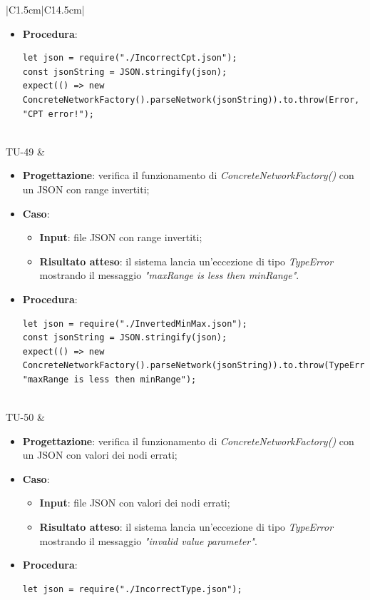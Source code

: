 \begin{longtable}{|C{1.5cm}|C{14.5cm}|}
\begin{itemize}
\begin{itemize}
		\end{itemize}
		\item \textbf{Procedura}:
		\begin{lstlisting}
let json = require("./IncorrectCpt.json");
const jsonString = JSON.stringify(json);
expect(() => new ConcreteNetworkFactory().parseNetwork(jsonString)).to.throw(Error, "CPT error!");
		\end{lstlisting}
	\end{itemize}\\
	\hline
	{TU-49} &
	\begin{itemize}
		\item \textbf{Progettazione}: verifica il funzionamento di \emph{ConcreteNetworkFactory()} con un JSON con range invertiti;
		\item \textbf{Caso}: 
		\begin{itemize}
			\item \textbf{Input}: file JSON con range invertiti;
			\item \textbf{Risultato atteso}: il sistema lancia un'eccezione di tipo \emph{TypeError} mostrando il messaggio \emph{"maxRange is less then minRange"}.
		\end{itemize}
		\item \textbf{Procedura}:
		\begin{lstlisting}
let json = require("./InvertedMinMax.json");
const jsonString = JSON.stringify(json);
expect(() => new ConcreteNetworkFactory().parseNetwork(jsonString)).to.throw(TypeError, "maxRange is less then minRange");
		\end{lstlisting}
	\end{itemize}\\
	\hline
	{TU-50} &
	\begin{itemize}
		\item \textbf{Progettazione}: verifica il funzionamento di \emph{ConcreteNetworkFactory()} con un JSON con valori dei nodi errati;
		\item \textbf{Caso}: 
		\begin{itemize}
			\item \textbf{Input}: file JSON con valori dei nodi errati;
			\item \textbf{Risultato atteso}: il sistema lancia un'eccezione di tipo \emph{TypeError} mostrando il messaggio \emph{"invalid value parameter"}.
		\end{itemize}
		\item \textbf{Procedura}:
		\begin{lstlisting}
let json = require("./IncorrectType.json");

\end{lstlisting}
\end{itemize}
\end{longtable}
